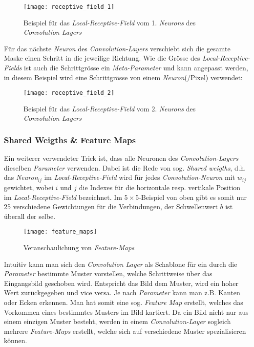 \begin{figure}[h]
	\ContinuedFloat*
	\centering
	\texttt{[image: receptive\_field\_1]}
	\caption[Beispiel für das \textit{Local-Receptive-Field} 1. \textit{Neuron}]{Beispiel für das \textit{Local-Receptive-Field} vom 1. \textit{Neurons} des \textit{Convolution-Layers}}
	\label{img:rec_field1}
\end{figure}

Für das nächste \textit{Neuron} des \textit{Convolution-Layers} verschiebt sich die gesamte Maske einen Schritt in die jeweilige Richtung. Wie die Grösse des \textit{Local-Receptive-Fields} ist auch die Schrittgrösse ein \textit{Meta-Parameter} und kann angepasst werden, in diesem Beispiel wird eine Schrittgrösse von einem \textit{Neuron}(/Pixel) verwendet:

\begin{figure}[h]
	\ContinuedFloat
	\centering
	\texttt{[image: receptive\_field\_2]}
	\caption[Beispiel für das \textit{Local-Receptive-Field} 2. \textit{Neuron}]{Beispiel für das \textit{Local-Receptive-Field} vom 2. \textit{Neurons} des \textit{Convolution-Layers}}
	\label{img:rec_field2}
\end{figure}

\subsubsection{Shared Weigths \& Feature Maps}
Ein weiterer verwendeter Trick ist, dass alle Neuronen des \textit{Convolution-Layers} dieselben \textit{Parameter} verwenden. Dabei ist die Rede von sog. \textit{Shared weigths}, d.h. das \textit{Neuron}$_{ij}$ im \textit{Local-Receptive-Field} wird für jedes \textit{Convolution-Neuron} mit $w_{ij}$ gewichtet, wobei $i$ und $j$ die Indexes für die horizontale resp. vertikale Position im \textit{Local-Receptive-Field} bezeichnet. Im $5\times 5$-Beispiel von oben gibt es somit nur 25 verschiedene Gewichtungen für die Verbindungen, der Schwellenwert $b$ ist überall der selbe.

\begin{figure}[h]
	\centering
	\texttt{[image: feature\_maps]}
	\caption[\textit{Feature-Maps}]{Veranschaulichung von \textit{Feature-Maps}}
	\label{img:feature_maps}
\end{figure}

Intuitiv kann man sich den \textit{Convolution Layer} als Schablone für ein durch die \textit{Parameter} bestimmte Muster vorstellen, welche Schrittweise über das Eingangsbild geschoben wird. Entspricht das Bild dem Muster, wird ein hoher Wert zurückgegeben und vice versa. Je nach \textit{Parameter} kann man z.B. Kanten oder Ecken erkennen. Man hat somit eine sog. \textit{Feature Map} erstellt, welches das Vorkommen eines bestimmtes Musters im Bild kartiert. Da ein Bild nicht nur aus einem einzigen Muster besteht, werden in einem \textit{Convolution-Layer} sogleich mehrere \textit{Feature-Maps} erstellt, welche sich auf verschiedene Muster spezialisieren können.


